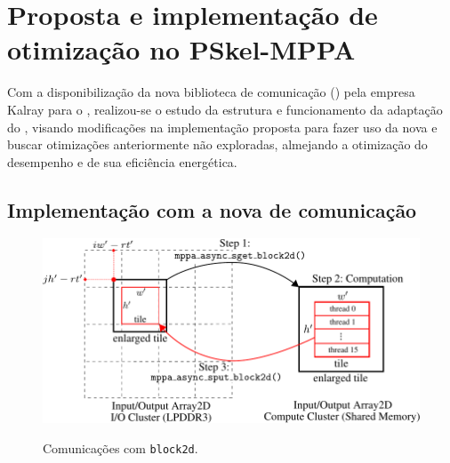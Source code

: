 %

\chapter{Proposta e implementação de otimização no PSkel-MPPA}
\label{cap:pskelMPPA}


Com a disponibilização da nova biblioteca de comunicação (\async) pela empresa Kalray para o \mppa, realizou-se o estudo da estrutura e funcionamento da adaptação do \pskelmppa, visando modificações na implementação proposta para fazer uso da nova \api e buscar otimizações anteriormente não exploradas, almejando a otimização do desempenho e de sua eficiência energética.

\section{Implementação com a nova \api de comunicação \async}
\label{sec:implementacao-async}

\begin{figure}
	\centering
	\caption{Comunicações com \texttt{block2d}.}
	\includegraphics[width=1\textwidth]{figs/pskel-mppa-fluxogram.pdf} \\
    \label{fig:block2d}
\end{figure}

